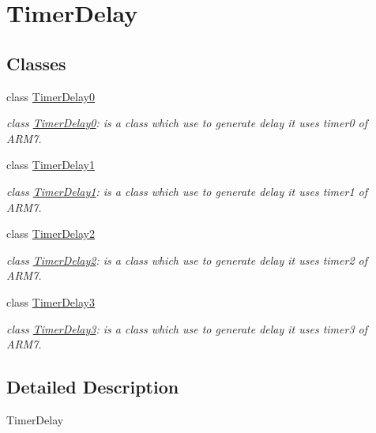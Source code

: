 \hypertarget{group__group3}{
\section{TimerDelay}
\label{dd/d3c/group__group3}
}
\subsection*{Classes}
\begin{DoxyCompactItemize}
\item 
class \hyperlink{class_timer_delay0}{TimerDelay0}
\begin{DoxyCompactList}\small\item\em class \hyperlink{class_timer_delay0}{TimerDelay0}: is a class which use to generate delay it uses timer0 of ARM7. \end{DoxyCompactList}\item 
class \hyperlink{class_timer_delay1}{TimerDelay1}
\begin{DoxyCompactList}\small\item\em class \hyperlink{class_timer_delay1}{TimerDelay1}: is a class which use to generate delay it uses timer1 of ARM7. \end{DoxyCompactList}\item 
class \hyperlink{class_timer_delay2}{TimerDelay2}
\begin{DoxyCompactList}\small\item\em class \hyperlink{class_timer_delay2}{TimerDelay2}: is a class which use to generate delay it uses timer2 of ARM7. \end{DoxyCompactList}\item 
class \hyperlink{class_timer_delay3}{TimerDelay3}
\begin{DoxyCompactList}\small\item\em class \hyperlink{class_timer_delay3}{TimerDelay3}: is a class which use to generate delay it uses timer3 of ARM7. \end{DoxyCompactList}\end{DoxyCompactItemize}


\subsection{Detailed Description}
TimerDelay 